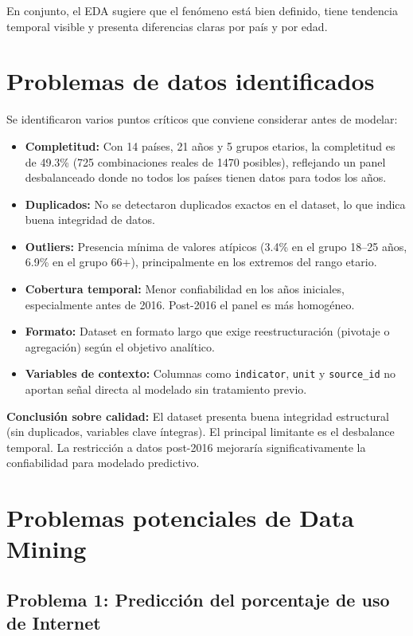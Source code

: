 \documentclass[12pt,a4paper]{article}
\begin{document}
En conjunto, el EDA sugiere que el fenómeno está bien definido, tiene tendencia temporal visible y presenta diferencias claras por país y por edad.

\section{Problemas de datos identificados}

Se identificaron varios puntos críticos que conviene considerar antes de modelar:

\begin{itemize}
    \item \textbf{Completitud:} Con 14 países, 21 años y 5 grupos etarios, la completitud es de 49.3\% (725 combinaciones reales de 1470 posibles), reflejando un panel desbalanceado donde no todos los países tienen datos para todos los años.
    \item \textbf{Duplicados:} No se detectaron duplicados exactos en el dataset, lo que indica buena integridad de datos.
    \item \textbf{Outliers:} Presencia mínima de valores atípicos (3.4\% en el grupo 18--25 años, 6.9\% en el grupo 66+), principalmente en los extremos del rango etario.
    \item \textbf{Cobertura temporal:} Menor confiabilidad en los años iniciales, especialmente antes de 2016. Post-2016 el panel es más homogéneo.
    \item \textbf{Formato:} Dataset en formato largo que exige reestructuración (pivotaje o agregación) según el objetivo analítico.
    \item \textbf{Variables de contexto:} Columnas como \texttt{indicator}, \texttt{unit} y \texttt{source\_id} no aportan señal directa al modelado sin tratamiento previo.
\end{itemize}

\noindent \textbf{Conclusión sobre calidad:} El dataset presenta buena integridad estructural (sin duplicados, variables clave íntegras). El principal limitante es el desbalance temporal. La restricción a datos post-2016 mejoraría significativamente la confiabilidad para modelado predictivo.

\section{Problemas potenciales de Data Mining}

\subsection{Problema 1: Predicción del porcentaje de uso de Internet}
\end{document}
